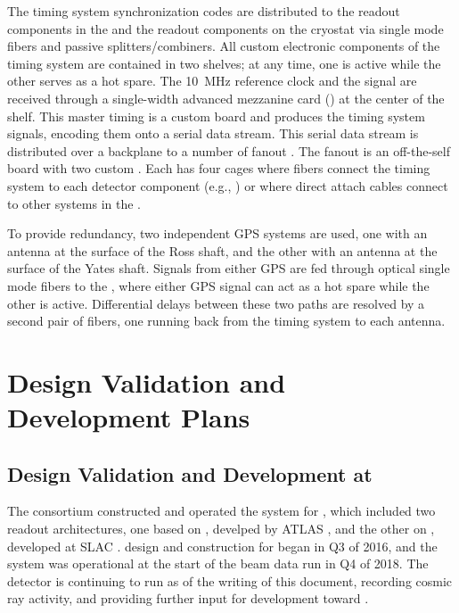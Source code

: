 The timing system synchronization codes are distributed to the  readout components in the  and the readout components on the cryostat via single mode fibers and passive splitters/combiners.
All custom electronic components of the timing system are contained in two  shelves; at any time, one is active while the other serves as a hot spare.
The \SI{10}{MHz} reference clock and the  signal are received through a single-width advanced mezzanine card () at the center of the  shelf.
This master timing  is a custom board and produces the timing system signals, encoding them onto a serial data stream.
This serial data stream is distributed over a backplane to a number of fanout .
The fanout  is an off-the-self board with two custom .
Each  has four  cages where fibers connect the timing system to each detector component (e.g., ) or where direct attach cables connect to other systems in the .

To provide redundancy, two independent GPS systems are used,
one with an antenna at the surface of the Ross shaft, and the other
with an antenna at the surface of the Yates shaft. Signals from either
GPS are fed through optical single mode fibers to the , where
either GPS signal can act as a hot spare while the other is active. 
Differential delays between these two paths are resolved by a second pair of fibers, one running back from the timing system to each antenna.


\section{Design Validation and Development Plans}

\subsection{Design Validation and Development at }

\label{sec:fd-daq:protodune}

The   consortium constructed and operated the  system for
, which included %
two  readout 
architectures, one based on , develped by ATLAS \cite{xx}, and the other on , developed at
SLAC \cite{xx}.  design and construction for
 began in Q3 of 2016, and the system was operational at the start of the beam data run %
in Q4 of 2018. The detector is
continuing to run as of the writing of this document, recording cosmic
ray activity, and %
providing further input for  development toward
. 

